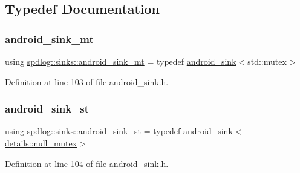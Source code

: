 \subsection{Typedef Documentation}
\mbox{\label{namespacespdlog_1_1sinks_afa3ee88e3e87a4908cd80f8ccd4fdd3e}} 
\subsubsection{\texorpdfstring{android\+\_\+sink\+\_\+mt}{android\_sink\_mt}}
{\footnotesize\ttfamily using \hyperlink{namespacespdlog_1_1sinks_afa3ee88e3e87a4908cd80f8ccd4fdd3e}{spdlog\+::sinks\+::android\+\_\+sink\+\_\+mt} = typedef \hyperlink{classspdlog_1_1sinks_1_1android__sink}{android\+\_\+sink}$<$std\+::mutex$>$}



Definition at line 103 of file android\+\_\+sink.\+h.

\mbox{\label{namespacespdlog_1_1sinks_a38acf93862031f1db0e4bdcf8e8b18f3}} 
\subsubsection{\texorpdfstring{android\+\_\+sink\+\_\+st}{android\_sink\_st}}
{\footnotesize\ttfamily using \hyperlink{namespacespdlog_1_1sinks_a38acf93862031f1db0e4bdcf8e8b18f3}{spdlog\+::sinks\+::android\+\_\+sink\+\_\+st} = typedef \hyperlink{classspdlog_1_1sinks_1_1android__sink}{android\+\_\+sink}$<$\hyperlink{structspdlog_1_1details_1_1null__mutex}{details\+::null\+\_\+mutex}$>$}



Definition at line 104 of file android\+\_\+sink.\+h.

\mbox{\label{namespacespdlog_1_1sinks_aa12104ff6999c8908f687c3eb87d827e}} 
